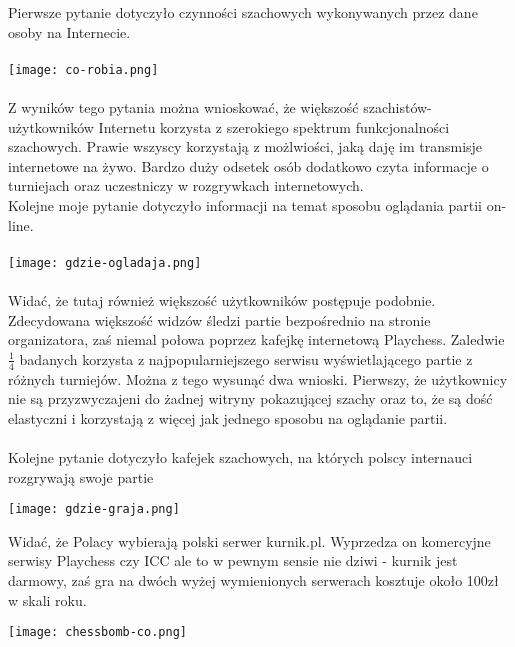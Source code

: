 \documentclass[12pt,leqno]{article}
\begin{document}
Pierwsze pytanie dotyczyło czynności szachowych wykonywanych przez dane osoby na Internecie.\\\\
\texttt{[image: co-robia.png]} \\\\
Z wyników tego pytania można wnioskować, że większość szachistów-użytkowników Internetu korzysta z szerokiego spektrum funkcjonalności szachowych. Prawie wszyscy korzystają z możlwiości, jaką daję im transmisje internetowe na żywo. Bardzo duży odsetek osób dodatkowo czyta informacje o turniejach oraz uczestniczy w rozgrywkach internetowych. \\
Kolejne moje pytanie dotyczyło informacji na temat sposobu oglądania partii on-line.\\\\
\texttt{[image: gdzie-ogladaja.png]}\\\\

Widać, że tutaj również większość użytkowników postępuje podobnie. Zdecydowana większość widzów śledzi partie bezpośrednio na stronie organizatora, zaś niemal połowa poprzez kafejkę internetową Playchess. Zaledwie $\frac{1}{4}$ badanych korzysta z najpopularniejszego serwisu wyświetlającego partie z różnych turniejów. Można z tego wysunąć dwa wnioski. Pierwszy, że użytkownicy nie są przyzwyczajeni do żadnej witryny pokazującej szachy oraz to, że są dość elastyczni i korzystają z więcej jak jednego sposobu na oglądanie partii.\\\\
Kolejne pytanie dotyczyło kafejek szachowych, na których polscy internauci rozgrywają swoje partie


\texttt{[image: gdzie-graja.png]}

Widać, że Polacy wybierają polski serwer kurnik.pl. Wyprzedza on komercyjne serwisy Playchess czy ICC ale to w pewnym sensie nie dziwi - kurnik jest darmowy, zaś gra na dwóch wyżej wymienionych serwerach kosztuje około 100zł w skali roku. 


\texttt{[image: chessbomb-co.png]}
\end{document}
